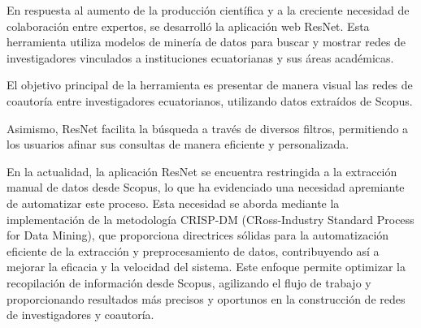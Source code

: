 
En respuesta al aumento de la producción científica y a la creciente necesidad de colaboración entre expertos, se desarrolló la aplicación web ResNet. Esta herramienta utiliza modelos de minería de datos para buscar y mostrar redes de investigadores vinculados a instituciones ecuatorianas y sus áreas académicas.


El objetivo principal de la herramienta es presentar de manera visual las redes de coautoría entre investigadores ecuatorianos, utilizando datos extraídos de Scopus. 

Asimismo, ResNet facilita la búsqueda a través de diversos filtros, permitiendo a los usuarios afinar sus consultas de manera eficiente y personalizada.

En la actualidad, la aplicación ResNet se encuentra restringida a la extracción manual de datos desde Scopus, lo que ha evidenciado una necesidad apremiante de automatizar este proceso. Esta necesidad se aborda mediante la implementación de la metodología CRISP-DM (CRoss-Industry Standard Process for Data Mining), que proporciona directrices sólidas para la automatización eficiente de la extracción y preprocesamiento de datos, contribuyendo así a mejorar la eficacia y la velocidad del sistema. Este enfoque permite optimizar la recopilación de información desde Scopus, agilizando el flujo de trabajo y proporcionando resultados más precisos y oportunos en la construcción de redes de investigadores y coautoría.